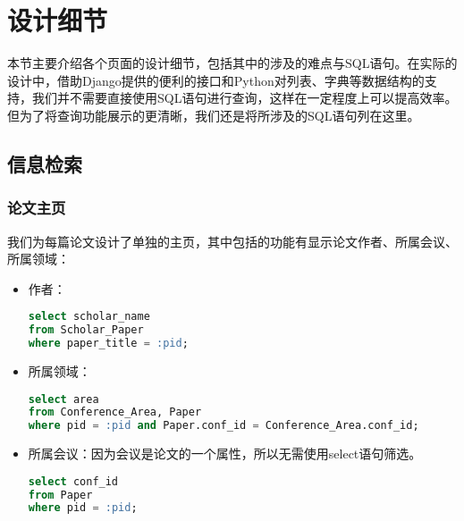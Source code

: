 
\section{设计细节}

本节主要介绍各个页面的设计细节，包括其中的涉及的难点与SQL语句。在实际的设计中，借助Django提供的便利的接口和Python对列表、字典等数据结构的支持，我们并不需要直接使用SQL语句进行查询，这样在一定程度上可以提高效率。但为了将查询功能展示的更清晰，我们还是将所涉及的SQL语句列在这里。

\subsection{信息检索}

\subsubsection{论文主页}
我们为每篇论文设计了单独的主页，其中包括的功能有显示论文作者、所属会议、所属领域：
\begin{itemize}
\item 作者：
\begin{lstlisting}[language=SQL]
select scholar_name
from Scholar_Paper
where paper_title = :pid;
\end{lstlisting}
\item 所属领域：
\begin{lstlisting}[language=SQL]
select area
from Conference_Area, Paper
where pid = :pid and Paper.conf_id = Conference_Area.conf_id;
\end{lstlisting}
\item 所属会议：因为会议是论文的一个属性，所以无需使用select语句筛选。
\begin{lstlisting}[language=SQL]
select conf_id
from Paper
where pid = :pid;
\end{lstlisting}
\end{itemize}

